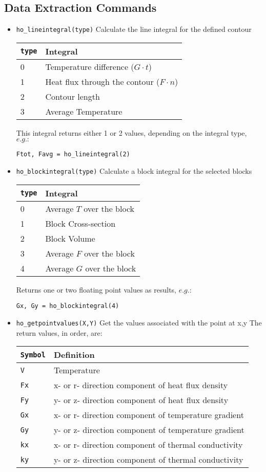 \subsection{Data Extraction Commands}
\begin{itemize}

\item \texttt{ho\_lineintegral(type)} Calculate the line integral for the defined contour

\begin{tabular}{ll}
\texttt{type} & Integral \\ \hline
 0 & Temperature difference ($G \cdot t$) \\
 1 & Heat flux through the contour ($F \cdot n$) \\
 2 & Contour length \\
 3 & Average Temperature \\
\end{tabular}

This integral returns either 1 or 2 values, depending on the
integral type, $e.g.:$

\texttt{Ftot, Favg = ho\_lineintegral(2)}

\item \texttt{ho\_blockintegral(type)} Calculate a block integral for the selected
blocks

\begin{tabular}{ll}
\texttt{type} & Integral \\ \hline
 0 & Average $T$ over the block \\
 1 & Block Cross-section \\
 2 & Block Volume \\
 3 & Average $F$ over the block \\
 4 & Average $G$ over the block \\
\end{tabular}

Returns one or two floating point values as results, $e.g$.:

\texttt{Gx, Gy = ho\_blockintegral(4)}

\item \texttt{ho\_getpointvalues(X,Y)} Get the values associated with the point at x,y
The return values, in order, are:

\begin{tabular}{ll}
\texttt{Symbol} &  Definition \\ \hline
\texttt{V} & Temperature \\
\texttt{Fx} & x- or r- direction component of heat flux density \\
\texttt{Fy} & y- or z- direction component of heat flux density \\
\texttt{Gx} & x- or r- direction component of temperature gradient \\
\texttt{Gy} & y- or z- direction component of temperature gradient \\
\texttt{kx} & x- or r- direction component of thermal conductivity \\
\texttt{ky} & y- or z- direction component of thermal conductivity \\
\end{tabular}


\end{itemize}

